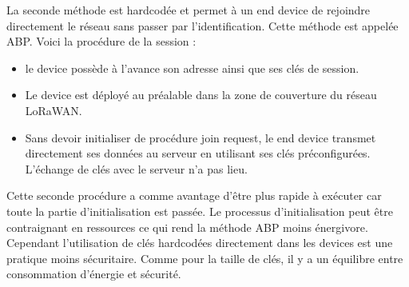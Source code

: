 \newpage
        
La seconde méthode est hardcodée et permet à un end device de rejoindre directement le réseau sans passer par l'identification. Cette méthode est appelée \ac{ABP}. Voici la procédure de la session :
\begin{itemize}
\item le device possède à l'avance son adresse ainsi que ses clés de session.
\item Le device est déployé au préalable dans la zone de couverture du réseau LoRaWAN.
\item Sans devoir initialiser de procédure join request, le end device transmet directement ses données au serveur en utilisant ses clés préconfigurées. L'échange de clés avec le serveur n'a pas lieu.
\end{itemize}

Cette seconde procédure a comme avantage d'être plus rapide à exécuter car toute la partie d'initialisation est passée. Le processus d'initialisation peut être contraignant en ressources ce qui rend la méthode \ac{ABP} moins énergivore. Cependant l'utilisation de clés hardcodées directement dans les devices est une pratique moins sécuritaire. Comme pour la taille de clés, il y a un équilibre entre consommation d'énergie et sécurité.
